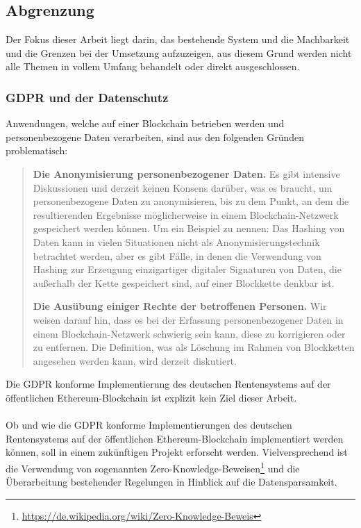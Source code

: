 \subsection{Abgrenzung}
Der Fokus dieser Arbeit liegt darin, das bestehende System und die Machbarkeit und die Grenzen bei der Umsetzung aufzuzeigen, aus diesem Grund werden nicht alle Themen in vollem Umfang behandelt oder direkt ausgeschlossen.

\subsubsection{GDPR und der Datenschutz}
Anwendungen, welche auf einer Blockchain betrieben werden und personenbezogene Daten verarbeiten, sind aus den folgenden Gründen problematisch:

\begin{quote}
\textbf{Die Anonymisierung personenbezogener Daten.} Es gibt intensive Diskussionen und derzeit keinen Konsens darüber, was es braucht, um personenbezogene Daten zu anonymisieren, bis zu dem Punkt, an dem die resultierenden Ergebnisse möglicherweise in einem Blockchain-Netzwerk gespeichert werden können. Um ein Beispiel zu nennen: Das Hashing von Daten kann in vielen Situationen nicht als Anonymisierungstechnik betrachtet werden, aber es gibt Fälle, in denen die Verwendung von Hashing zur Erzeugung einzigartiger digitaler Signaturen von Daten, die außerhalb der Kette gespeichert sind, auf einer Blockkette denkbar ist.

\textbf{Die Ausübung einiger Rechte der betroffenen Personen.} Wir weisen darauf hin, dass es bei der Erfassung personenbezogener Daten in einem Blockchain-Netzwerk schwierig sein kann, diese zu korrigieren oder zu entfernen. Die Definition, was als Löschung im Rahmen von Blockketten angesehen werden kann, wird derzeit diskutiert.\cite{gdpr}
\end{quote}

Die GDPR konforme Implementierung des deutschen Rentensystems auf der öffentlichen Ethereum-Blockchain ist explizit kein Ziel dieser Arbeit.

\paragraph*{}
Ob und wie die GDPR konforme Implementierungen des deutschen Rentensystems auf der öffentlichen Ethereum-Blockchain implementiert werden können, soll in einem zukünftigen Projekt erforscht werden. Vielversprechend ist die Verwendung von sogenannten Zero-Knowledge-Beweisen\footnote{\url{https://de.wikipedia.org/wiki/Zero-Knowledge-Beweis}} und die Überarbeitung bestehender Regelungen in Hinblick auf die Datensparsamkeit.

